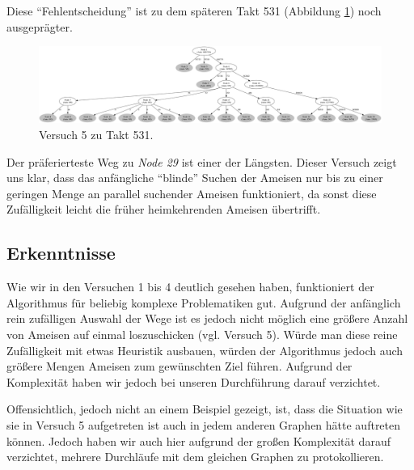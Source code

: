 Diese "`Fehlentscheidung"' ist zu dem späteren Takt 531 (Abbildung \ref{fig:v5_531}) noch ausgeprägter.

\begin{figure}[htbp]
	\includegraphics[width=\textwidth]{images/v5_531.png}
	\caption{Versuch 5 zu Takt 531.}
	\label{fig:v5_531}
\end{figure}

Der präferierteste Weg zu \emph{Node 29} ist einer der Längsten.
Dieser Versuch zeigt uns klar, dass das anfängliche "`blinde"' Suchen der Ameisen  nur bis zu einer geringen Menge an parallel suchender Ameisen funktioniert, da sonst diese Zufälligkeit leicht die früher heimkehrenden Ameisen übertrifft.

\subsection{Erkenntnisse}
\label{sec:erkent}
Wie wir in den Versuchen 1 bis 4 deutlich gesehen haben, funktioniert der Algorithmus für beliebig komplexe Problematiken gut.
Aufgrund der anfänglich rein zufälligen Auswahl der Wege ist es jedoch nicht möglich eine größere Anzahl von Ameisen auf einmal loszuschicken (vgl. Versuch 5).
Würde man diese reine Zufälligkeit mit etwas Heuristik ausbauen, würden der Algorithmus jedoch auch größere Mengen Ameisen zum gewünschten Ziel führen.
Aufgrund der Komplexität haben wir jedoch bei unseren Durchführung darauf verzichtet.\par
Offensichtlich, jedoch nicht an einem Beispiel gezeigt, ist, dass die Situation wie sie in Versuch 5 aufgetreten ist auch in jedem anderen Graphen hätte auftreten können. Jedoch haben wir auch hier aufgrund der großen Komplexität darauf verzichtet, mehrere Durchläufe mit dem gleichen Graphen zu protokollieren.

